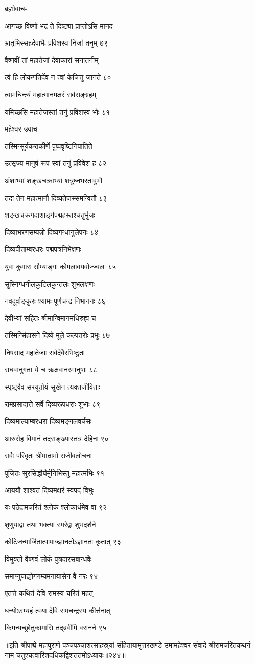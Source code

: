 ब्रह्मोवाच-

आगच्छ विष्णो भद्रं ते दिष्ट्या प्राप्तोऽसि मानद

भ्रातृभिस्सहदेवाभैः प्रविशस्व निजां तनुम् ७९

वैष्णवीं तां महातेजां देवाकारां सनातनीम्

त्वं हि लोकगतिर्देव न त्वां केचित्तु जानते ८०

त्वामचिन्त्यं महात्मानमक्षरं सर्वसङ्ग्रहम्

यमिच्छसि महातेजस्तां तनुं प्रविशस्व भोः ८१

महेश्वर उवाच-

तस्मिन्सूर्यकराकीर्णे पुष्पवृष्टिनिपातिते

उत्सृज्य मानुषं रूपं स्वां तनुं प्रविवेश ह ८२

अंशाभ्यां शङ्खचक्राभ्यां शत्रुघ्नभरतावुभौ

तदा तेन महात्मानौ दिव्यतेजस्समन्वितौ ८३

शङ्खचक्रगदाशार्ङ्गपद्महस्तश्चतुर्भुजः

दिव्याभरणसम्पन्नो दिव्यगन्धानुलेपनः ८४

दिव्यपीताम्बरधरः पद्मपत्रनिभेक्षणः

युवा कुमारः सौम्याङ्गः कोमलावयवोज्ज्वलः ८५

सुस्निग्धनीलकुटिलकुन्तलः शुभलक्षणः

नवदूर्वाङ्कुरः श्यामः पूर्णचन्द्र निभाननः ८६

देवीभ्यां सहितः श्रीमान्विमानमधिरुह्य च

तस्मिन्सिंहासने दिव्ये मूले कल्पतरोः प्रभुः ८७

निषसाद महातेजाः सर्वदेवैरभिष्टुतः

राघवानुगता ये च ऋक्षवानरमानुषाः ८८

स्पृष्ट्वैव सरयूतोयं सुखेन त्यक्तजीविताः

रामप्रसादात्ते सर्वे दिव्यरूपधराः शुभाः ८९

दिव्यमाल्याम्बरधरा दिव्यमङ्गलवर्चसः

आरुरोह विमानं तदसङ्ख्यास्तत्र देहिनः ९०

सर्वैः परिवृतः श्रीमान्रामो राजीवलोचनः

पूजितः सुरसिद्धौघैर्मुनिभिस्तु महात्मभिः ९१

आययौ शाश्वतं दिव्यमक्षरं स्वपदं विभुः

यः पठेद्रामचरितं श्लोकं श्लोकार्धमेव वा ९२

शृणुयाद्वा तथा भक्त्या स्मरेद्वा शुभदर्शने

कोटिजन्मार्जितात्पापाज्ज्ञानतोऽज्ञानतः कृतात् ९३

विमुक्तो वैष्णवं लोकं पुत्रदारसबान्धवैः

समाप्नुयाद्योगगम्यमनायासेन वै नरः ९४

एतत्ते कथितं देवि रामस्य चरितं महत्

धन्योऽस्म्यहं त्वया देवि रामचन्द्रस्य कीर्त्तनात्

किमन्यच्छ्रोतुकामासि तद्ब्रवीमि वरानने ९५

॥इति श्रीपाद्मे महापुराणे पञ्चपञ्चाशत्साहस्र्यां संहितायामुत्तरखण्डे उमामहेश्वर संवादे श्रीरामचरितकथनं नाम चतुश्चत्वारिंशदधिकद्विशततमोऽध्यायः॥२४४॥


